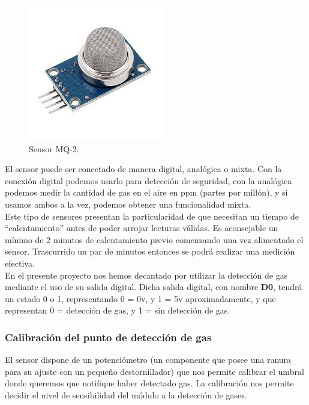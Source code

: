 \begin{figure}[H]
  \begin{center}
    \includegraphics[scale=0.6]{imagenes/mq2_sensor.jpg}
  \end{center}
  \caption{Sensor MQ-2.}
  \label{figura:sensor_mq_2}
\end{figure}

El sensor puede ser conectado de manera digital, analógica o mixta. Con la conexión digital podemos usarlo para detección de seguridad, con la analógica podemos medir la cantidad 
de gas en el aire en ppm (partes por millón), y si usamos ambos a la vez, podemos obtener una funcionalidad mixta.\\

Este tipo de sensores presentan la particularidad de que necesitan un tiempo de “calentamiento” antes de poder arrojar lecturas válidas. Es aconsejable un mínimo de 2 minutos
de calentamiento previo comenzando una vez alimentado el sensor. Trascurrido un par de minutos entonces se podrá realizar una medición efectiva.\\

En el presente proyecto nos hemos decantado por utilizar la detección de gas mediante el uso de su salida digital. Dicha salida digital, con nombre \textbf{D0}, tendrá un estado
0 o 1, representando 0 = 0v, y 1 = 5v aproximadamente, y que representan 0 = detección de gas, y 1 = sin detección de gas. 

\subsubsection{ Calibración del punto de detección de gas}

El sensor dispone de un potenciómetro (un componente que posee una ranura para su ajuste con un pequeño destornillador) que nos permite calibrar el umbral donde queremos que
notifique haber detectado gas. La calibración nos permite decidir el nivel de sensibilidad del módulo a la detección de gases.\\

